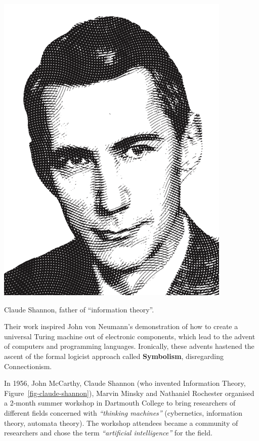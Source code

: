 \documentclass[
  letterpaper,
  12pt,
  british]{tufte-book}
\theoremstyle{plain}
\theoremstyle{definition}
\theoremstyle{plain}
\theoremstyle{remark}
\begin{document}
\hypertarget{fig-claude-shannon}{}
\begin{marginfigure}

\includegraphics{Images/shannon.png}

\label{fig-claude-shannon}Claude Shannon, father of ``information
theory''.

\end{marginfigure}

Their work inspired John von Neumann's demonstration of how to create a
universal Turing machine out of electronic components, which lead to the
advent of computers and programming languages. Ironically, these advents
hastened the ascent of the formal logicist approach called
\textbf{Symbolism}, disregarding Connectionism.

In 1956, John McCarthy, Claude Shannon (who invented Information Theory,
Figure~\ref{fig-claude-shannon}), Marvin Minsky and Nathaniel Rochester
organised a 2-month summer workshop in Dartmouth College to bring
researchers of different fields concerned with \emph{``thinking
machines''} (cybernetics, information theory, automata theory). The
workshop attendees became a community of researchers and chose the term
\emph{``artificial intelligence''} for the field.
\end{document}
